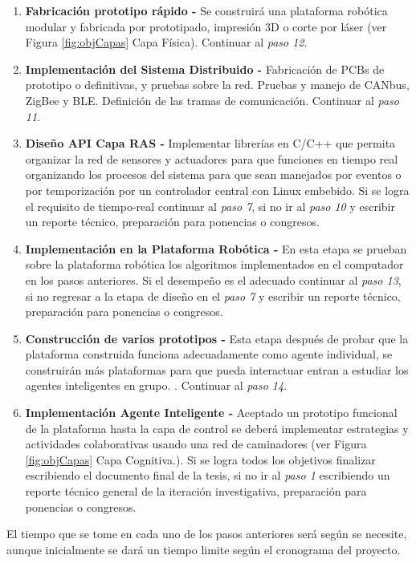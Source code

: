 {\begin{enumerate}
  \item \textbf{Fabricaci\'on prototipo r\'apido - } Se construir\'a una plataforma rob\'otica modular y fabricada por prototipado, impresión 3D o corte por láser (ver Figura \ref{fig:objCapas} Capa Física). Continuar al \emph{paso 12}.\par
  \item \textbf{Implementaci\'on del Sistema Distribuido - } Fabricaci\'on de PCBs de prototipo o definitivas, y pruebas sobre la red. Pruebas y manejo de CANbus, ZigBee y BLE. Definición de las tramas de comunicaci\'on. Continuar al \emph{paso 11}.\par
  \item \textbf{Dise\~no API Capa RAS - } Implementar librerías en C/C++ que permita organizar la red de sensores y actuadores para que funciones en tiempo real organizando los procesos del sistema para que sean manejados por eventos o por temporizaci\'on por un controlador central con Linux embebido. Si se logra el requisito de tiempo-real continuar al \emph{paso 7}, si no ir al \emph{paso 10} y escribir un reporte t\'ecnico, preparaci\'on para ponencias o congresos.\par
  \item \textbf{Implementación en la Plataforma Rob\'otica - } En esta etapa se prueban sobre la plataforma rob\'otica los algoritmos implementados en el computador en los pasos anteriores. Si el desempe\~no es el adecuado continuar al \emph{paso 13}, si no regresar a la etapa de dise\~no en el \emph{paso 7} y escribir un reporte t\'ecnico, preparaci\'on para ponencias o congresos.\par
  \item \textbf{Construcción de varios prototipos - } Esta etapa despu\'es de probar que la plataforma construida funciona adecuadamente como agente individual, se construir\'an m\'as plataformas para que pueda interactuar entran a estudiar los agentes inteligentes en grupo. . Continuar al \emph{paso 14}.\par
  \item \textbf{Implementaci\'on Agente Inteligente - } Aceptado un prototipo funcional de la plataforma hasta la capa de control se deberá  implementar estrategias y actividades colaborativas usando una red de caminadores  (ver Figura \ref{fig:objCapas} Capa Cognitiva.). Si se logra todos los objetivos finalizar escribiendo el documento final de la tesis, si no ir al \emph{paso 1} escribiendo un reporte t\'ecnico general de la iteraci\'on investigativa, preparaci\'on para ponencias o congresos.\par
  \end{enumerate}
  El tiempo que se tome en cada uno de los pasos anteriores ser\'a seg\'un se necesite, aunque inicialmente se dar\'a un tiempo limite seg\'un el cronograma del proyecto.\par
}
